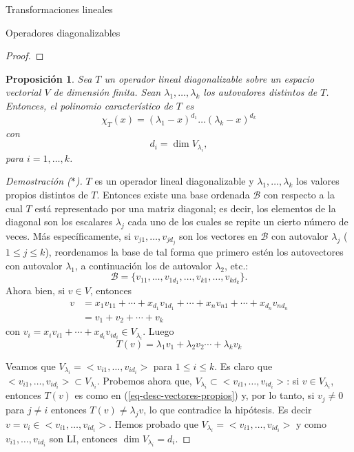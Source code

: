 \documentclass[a4paper,12pt,twoside,spanish,reqno]{amsbook}
\numberwithin{equation}{section}
\newtheorem{proposicion}[teorema]{Proposici\'on}
\theoremstyle{definition}
\theoremstyle{remark}
\begin{document}
\begin{chapter}{Transformaciones lineales}
\begin{section}{Operadores diagonalizables}
\begin{proof}
        \end{proof}
    
        \begin{proposicion}
             Sea $T$ un operador lineal diagonalizable sobre un espacio vectorial $V$ de dimensión finita. Sean $\lambda_1,\ldots,\lambda_k$ los autovalores distintos de $T$. Entonces,  el  polinomio característico de $T$ es
                 $$
                 \chi_T(x) = (\lambda_1 -x)^{d_1}\ldots(\lambda_k- x)^{d_k}
                 $$
                 con
                 $$
                 d_i =  \dim V_{\lambda_i},
                 $$
                 para  $i=1, \ldots, k$.
        \end{proposicion}
        \begin{proof}[Demostración ($*$)]
            $T$ es un operador lineal diagonalizable y $\lambda_1,\ldots,\lambda_k$ los valores propios distintos de $T$. Entonces existe una base ordenada $\mathcal B$ con respecto a la cual $T$ está representado por una matriz diagonal; es decir, los elementos de la diagonal son los escalares $\lambda_j$ cada uno de los cuales se repite un cierto número de veces. Más específicamente, si
             $v_{j1},\ldots,v_{jd_j}$ son los vectores en $\mathcal{B}$ con autovalor $\lambda_j$ ($1 \le j \le k$),  reordenamos la base de tal forma que primero estén los autovectores con autovalor $\lambda_1$, a continuación los de autovalor $\lambda_2$, etc.: 
            \begin{equation*}
                \mathcal{B} = \{v_{11},\ldots,v_{1d_1},\ldots,v_{k1},\ldots,v_{kd_k}\}. 
            \end{equation*}
            Ahora bien,  si $v \in V$,  entonces 
            \begin{align*}
            v &=x_1v_{11}+\cdots+x_{d_1}v_{1d_1}+\cdots+x_nv_{n1}+\cdots+x_{d_n}v_{nd_n} \\
            &= v_1 + v_2 +\cdots + v_k
            \end{align*}
            con $v_i = x_iv_{i1}+\cdots+x_{d_i}v_{id_i} \in V_{\lambda_i}$. Luego
            \begin{equation}\label{eq-desc-vectores-propios}
                T(v)  =\lambda_1v_1+\lambda_2v_2\cdots+\lambda_kv_k
            \end{equation} 
            
            Veamos que $V_{\lambda_i} = <v_{i1},\ldots,v_{id_i}>$ para $1 \le i \le k$. Es claro que  $<v_{i1},\ldots,v_{id_i}> \subset V_{\lambda_i}$. Probemos  ahora que,  $V_{\lambda_i} \subset <v_{i1},\ldots,v_{id_i}>$: si  $v \in V_{\lambda_i}$,  entonces $T(v)$ es como en (\ref{eq-desc-vectores-propios}) y, por lo tanto, si $v_j \ne 0$ para $j\not=i$ entonces $T(v) \ne \lambda_j v$, lo que contradice la hipótesis. Es decir $v = v_i \in <v_{i1},\ldots,v_{id_i}>$. Hemos probado que    $V_{\lambda_i} = <v_{i1},\ldots,v_{id_i}>$ y como $v_{i1},\ldots,v_{id_i}$ son LI, entonces $\dim V_{\lambda_i} = d_i$.
            

\end{proof}
\end{section}
\end{chapter}
\end{document}
